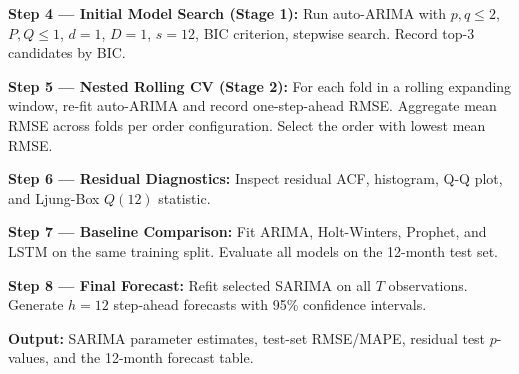 \documentclass[12pt]{article}
\begin{document}
\noindent\textbf{Step 4 --- Initial Model Search (Stage 1):} Run auto-ARIMA with $p,q \le 2$, $P,Q \le 1$, $d=1$, $D=1$, $s=12$, BIC criterion, stepwise search. Record top-3 candidates by BIC.

\noindent\textbf{Step 5 --- Nested Rolling CV (Stage 2):} For each fold in a rolling expanding window, re-fit auto-ARIMA and record one-step-ahead RMSE. Aggregate mean RMSE across folds per order configuration. Select the order with lowest mean RMSE.

\noindent\textbf{Step 6 --- Residual Diagnostics:} Inspect residual ACF, histogram, Q-Q plot, and Ljung-Box $Q(12)$ statistic.

\noindent\textbf{Step 7 --- Baseline Comparison:} Fit ARIMA, Holt-Winters, Prophet, and LSTM on the same training split. Evaluate all models on the 12-month test set.

\noindent\textbf{Step 8 --- Final Forecast:} Refit selected SARIMA on all $T$ observations. Generate $h=12$ step-ahead forecasts with 95\% confidence intervals.

\noindent\textbf{Output:} SARIMA parameter estimates, test-set RMSE/MAPE, residual test $p$-values, and the 12-month forecast table.
\end{document}
